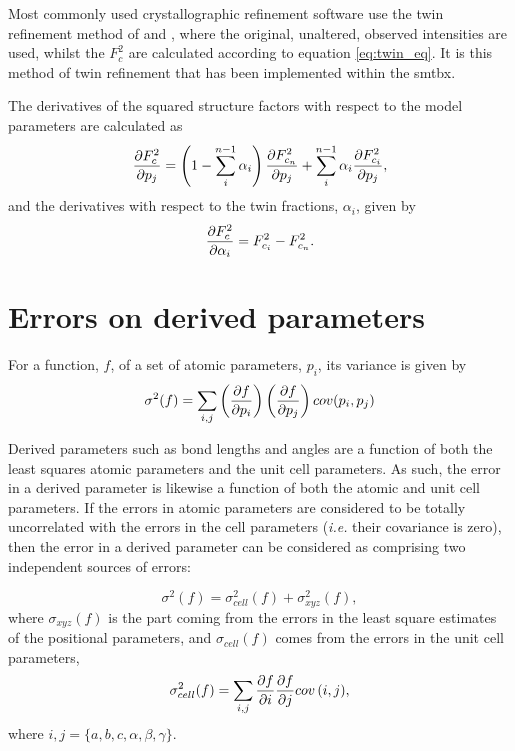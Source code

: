 \documentclass[pdf]{iucr}
\begin{document}
Most commonly used crystallographic refinement software \cite{Sheldrick:sc5010,Betteridge:os5005} use the twin refinement method of \cite{Jameson:a20747} and \cite{J19710002146}, where the original, unaltered, observed intensities are used, whilst the $F_c^2$ are calculated according to equation \ref{eq:twin_eq}. It is this method of twin refinement that has been implemented within the smtbx.

The derivatives of the squared structure factors with respect to the model parameters are calculated as
\begin{equation}
\frac{\partial F_c^2}{\partial p_j} = \left(1-\sum_i^{n-1}{\alpha_i}\right) \frac{\partial F_{c_n}^2}{\partial p_j} + \sum_i^{n-1}{\alpha_i \frac{\partial F_{c_i}^2}{\partial p_j}}
\label{eq:twin_grads},
\end{equation}
and the derivatives with respect to the twin fractions, $\alpha_i$, given by
\begin{equation}
\frac{\partial F_c^2}{\partial \alpha_i} = F_{c_i}^2 - F_{c_n}^2
\label{eq:twin_fraction_grads}.
\end{equation}





\section{Errors on derived parameters}
\label{sec:errors}

For a function, $f$, of a set of atomic parameters, $p_i$, its variance is given by \cite{Sands:a05356}
\begin{equation}
\sigma^2(f) = \sum_{i,j}{\left(\frac{\partial f}{\partial p_i}\right) \left(\frac{\partial f}{\partial p_j}\right) cov(p_i,p_j)}
\label{eq:sigma_f}
\end{equation}

Derived parameters such as bond lengths and angles are a function of both the least squares atomic parameters and the unit cell parameters. As such, the error in a derived parameter is likewise a function of both the atomic and unit cell parameters. If the errors in atomic parameters are considered to be totally uncorrelated with the errors in the cell parameters (\emph{i.e.} their covariance is zero), then the error in a derived parameter can be considered as comprising two independent sources of errors:

\begin{equation}
\sigma^2(f) = \sigma^2_{cell}(f) + \sigma^2_{xyz}(f)
\label{eq:sigma_d},
\end{equation}
where $\sigma_{xyz}(f)$ is the part coming from the errors in the least square estimates of the positional parameters, and $\sigma_{cell}(f)$ comes from the errors in the unit cell parameters,
\begin{equation}
\sigma^2_{cell}(f) = \sum_{i,j}{{\frac{\partial f}{\partial i}\frac{\partial f}{\partial j} cov\left(i,j\right)}}
\label{eq:sigma_cell},
\end{equation}
where $i,j=\lbrace{a,b,c,\alpha,\beta,\gamma\rbrace}$.
\end{document}
